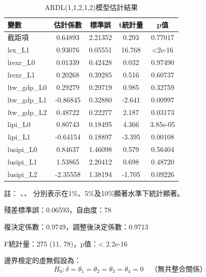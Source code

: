 \documentclass[a4paper,12pt]{article}
\begin{document}
\begin{table}[h!]
  \centering
  \begin{threeparttable}
    \caption{ARDL(1,1,2,1,2)模型估計結果}
    \label{tab:ardl_results}
    \begin{tabular}{lcccc}
      \toprule
      變數 & 估計係數 & 標準誤 & t統計量 & p值 \\
      \midrule
      截距項      & 0.64893        & 2.21352 & 0.293   & 0.77017 \\
      lex\_L1       & 0.93076\tnote{***} & 0.05551 & 16.768  & <2e-16 \\
      lrexr\_L0     & 0.01339        & 0.42428 & 0.032   & 0.97490 \\
      lrexr\_L1     & 0.20268        & 0.39285 & 0.516   & 0.60737 \\
      ltw\_gdp\_L0   & 0.29279        & 0.29719 & 0.985   & 0.32759 \\
      ltw\_gdp\_L1   & -0.86845\tnote{***} & 0.32880 & -2.641  & 0.00997 \\
      ltw\_gdp\_L2   & 0.48722\tnote{**}  & 0.22277 & 2.187   & 0.03173 \\
      lipi\_L0       & 0.80743\tnote{***} & 0.18495 & 4.366   & 3.85e-05 \\
      lipi\_L1       & -0.64154\tnote{***} & 0.18897 & -3.395  & 0.00108 \\
      lusipi\_L0    & 0.84637        & 1.46098 & 0.579   & 0.56404 \\
      lusipi\_L1    & 1.53865        & 2.20412 & 0.698   & 0.48720 \\
      lusipi\_L2    & -2.35558\tnote{*}  & 1.38194 & -1.705  & 0.09226 \\
      \bottomrule
    \end{tabular}
    \begin{tablenotes}
      \small{ %
      \item 註： \tnote{***}、\tnote{**}、\tnote{*} 分別表示在1\%、5\%及10\%顯著水準下統計顯著。
      \item 殘差標準誤：0.06593，自由度：78
      \item 複決定係數：0.9749，調整後決定係數：0.9713
      \item F統計量：275 (11, 78)，p值：< 2.2e-16}
    \end{tablenotes}
  \end{threeparttable}
\end{table}
邊界檢定的虛無假設為：
\begin{equation}
H_0: \delta = \theta_1 = \theta_2 = \theta_3 = \theta_4 = 0 \quad \text{（無共整合關係）}
\end{equation}
\end{document}
